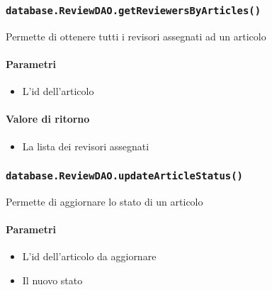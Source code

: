 \subsubsection{\texttt{database.ReviewDAO.getReviewersByArticles()}}
Permette di ottenere tutti i revisori assegnati ad un articolo
\paragraph{Parametri}
\begin{itemize}
\item L'id dell'articolo
\end{itemize}
\paragraph{Valore di ritorno}
\begin{itemize}
\item La lista dei revisori assegnati
\end{itemize}

\subsubsection{\texttt{database.ReviewDAO.updateArticleStatus()}}
Permette di aggiornare lo stato di un articolo
\paragraph{Parametri}
\begin{itemize}
\item L'id dell'articolo da aggiornare
\item Il nuovo stato
\end{itemize}

